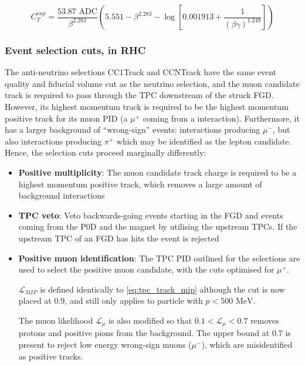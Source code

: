 

\begin{equation}
C_T^{exp} = \frac{53.87 \text{ ADC}}{\beta^{2.283}} \left( 5.551 - \beta^{2.283} - \log\left[0.001913 + \frac{1}{\left(\beta\gamma\right)^{1.249}}\right]\right)
\end{equation}

\subsubsection{Event selection cuts, \numubar in RHC}
\label{sec:numubar_sel}
The anti-neutrino selections CC1Track and CCNTrack have the same event quality and fiducial volume cut as the neutrino selection, and the muon candidate track is required to pass through the TPC downstream of the struck FGD. However, its highest momentum track is required to be the highest momentum positive track for its muon PID (a $\mu^+$ coming from a \numubar interaction). Furthermore, it has a larger background of ``wrong-sign'' events: \numu interactions producing $\mu^-$, but also \numu interactions producing $\pi^+$ which may be identified as the lepton candidate. Hence, the selection cuts proceed marginally differently:
\begin{itemize}
	\item \textbf{Positive multiplicity}: The muon candidate track charge is required to be a highest momentum positive track, which removes a large amount of \numu background interactions
	
	\item \textbf{TPC veto}: Veto backwards-going events starting in the FGD and events coming from the P0D and the magnet by utilising the upstream TPCs. If the upstream TPC of an FGD has hits the event is rejected
	
	\item \textbf{Positive muon identification}: The TPC PID outlined for the \numu selections are used to select the positive muon candidate, with the cuts optimised for $\mu^+$. 
	
	$\mathcal{L}_{MIP}$ is defined identically to \autoref{eq:tpc_track_mip} although the cut is now placed at 0.9, and still only applies to particle with $p < 500\text{ MeV}$.
		
	The muon likelihood $\mathcal{L}_\mu$ is also modified so that $0.1 < \mathcal{L}_\mu < 0.7$ removes protons and positive pions from the \numu background. The upper bound at 0.7 is present to reject low energy wrong-sign muons ($\mu^-$), which are misidentified as positive tracks.
\end{itemize}

